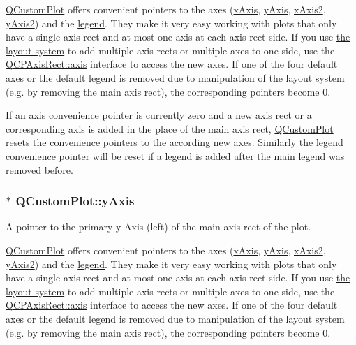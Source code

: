\hyperlink{classQCustomPlot}{Q\+Custom\+Plot} offers convenient pointers to the axes (\hyperlink{classQCustomPlot_a9a79cd0158a4c7f30cbc702f0fd800e4}{x\+Axis}, \hyperlink{classQCustomPlot_af6fea5679725b152c14facd920b19367}{y\+Axis}, \hyperlink{classQCustomPlot_ada41599f22cad901c030f3dcbdd82fd9}{x\+Axis2}, \hyperlink{classQCustomPlot_af13fdc5bce7d0fabd640f13ba805c0b7}{y\+Axis2}) and the \hyperlink{classQCustomPlot_a4eadcd237dc6a09938b68b16877fa6af}{legend}. They make it very easy working with plots that only have a single axis rect and at most one axis at each axis rect side. If you use \hyperlink{}{the layout system} to add multiple axis rects or multiple axes to one side, use the \hyperlink{classQCPAxisRect_a560de44e47a4af0f86c59102a094b1e4}{Q\+C\+P\+Axis\+Rect\+::axis} interface to access the new axes. If one of the four default axes or the default legend is removed due to manipulation of the layout system (e.\+g. by removing the main axis rect), the corresponding pointers become 0.

If an axis convenience pointer is currently zero and a new axis rect or a corresponding axis is added in the place of the main axis rect, \hyperlink{classQCustomPlot}{Q\+Custom\+Plot} resets the convenience pointers to the according new axes. Similarly the \hyperlink{classQCustomPlot_a4eadcd237dc6a09938b68b16877fa6af}{legend} convenience pointer will be reset if a legend is added after the main legend was removed before. 
\subsubsection[{\texorpdfstring{y\+Axis}{yAxis}}]{ $\ast$ Q\+Custom\+Plot\+::y\+Axis}\hypertarget{classQCustomPlot_af6fea5679725b152c14facd920b19367}{}\label{classQCustomPlot_af6fea5679725b152c14facd920b19367}
A pointer to the primary y Axis (left) of the main axis rect of the plot.

\hyperlink{classQCustomPlot}{Q\+Custom\+Plot} offers convenient pointers to the axes (\hyperlink{classQCustomPlot_a9a79cd0158a4c7f30cbc702f0fd800e4}{x\+Axis}, \hyperlink{classQCustomPlot_af6fea5679725b152c14facd920b19367}{y\+Axis}, \hyperlink{classQCustomPlot_ada41599f22cad901c030f3dcbdd82fd9}{x\+Axis2}, \hyperlink{classQCustomPlot_af13fdc5bce7d0fabd640f13ba805c0b7}{y\+Axis2}) and the \hyperlink{classQCustomPlot_a4eadcd237dc6a09938b68b16877fa6af}{legend}. They make it very easy working with plots that only have a single axis rect and at most one axis at each axis rect side. If you use \hyperlink{}{the layout system} to add multiple axis rects or multiple axes to one side, use the \hyperlink{classQCPAxisRect_a560de44e47a4af0f86c59102a094b1e4}{Q\+C\+P\+Axis\+Rect\+::axis} interface to access the new axes. If one of the four default axes or the default legend is removed due to manipulation of the layout system (e.\+g. by removing the main axis rect), the corresponding pointers become 0.

